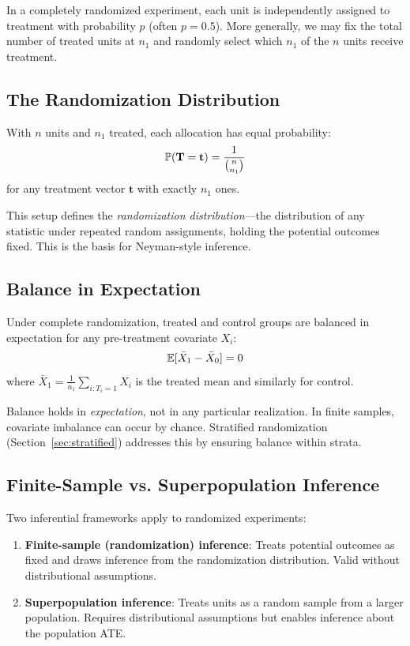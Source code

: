 In a completely randomized experiment, each unit is independently assigned to treatment with probability $p$ (often $p = 0.5$). More generally, we may fix the total number of treated units at $n_1$ and randomly select which $n_1$ of the $n$ units receive treatment.

\subsection{The Randomization Distribution}

With $n$ units and $n_1$ treated, each allocation has equal probability:
\begin{equation}
\mathbb{P}(\mathbf{T} = \mathbf{t}) = \frac{1}{\binom{n}{n_1}}
\end{equation}
for any treatment vector $\mathbf{t}$ with exactly $n_1$ ones.

This setup defines the \emph{randomization distribution}---the distribution of any statistic under repeated random assignments, holding the potential outcomes fixed. This is the basis for Neyman-style inference.

\subsection{Balance in Expectation}

Under complete randomization, treated and control groups are balanced in expectation for any pre-treatment covariate $X_i$:
\begin{equation}
\mathbb{E}[\bar{X}_1 - \bar{X}_0] = 0
\end{equation}
where $\bar{X}_1 = \frac{1}{n_1} \sum_{i: T_i = 1} X_i$ is the treated mean and similarly for control.

\begin{remark}
Balance holds in \emph{expectation}, not in any particular realization. In finite samples, covariate imbalance can occur by chance. Stratified randomization (Section~\ref{sec:stratified}) addresses this by ensuring balance within strata.
\end{remark}

\subsection{Finite-Sample vs. Superpopulation Inference}

Two inferential frameworks apply to randomized experiments:

\begin{enumerate}
    \item \textbf{Finite-sample (randomization) inference}: Treats potential outcomes as fixed and draws inference from the randomization distribution. Valid without distributional assumptions.

    \item \textbf{Superpopulation inference}: Treats units as a random sample from a larger population. Requires distributional assumptions but enables inference about the population ATE.
\end{enumerate}

